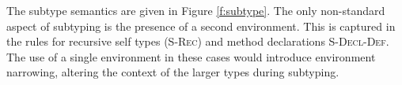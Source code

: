 The subtype semantics are given in Figure \ref{f:subtype}. The only non-standard aspect of subtyping is the presence of a second environment. This is captured in the rules for recursive self types (\textsc{S-Rec}) and method declarations \textsc{S-Decl-Def}. The use of a single environment in these cases would introduce environment narrowing, altering the context of the larger types during subtyping.

